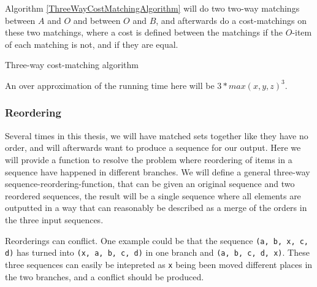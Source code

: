 \documentclass[11pt]{article}
\begin{document}
Algorithm \ref{ThreeWayCostMatchingAlgorithm} will do two two-way matchings between $A$ and $O$ and between $O$ and $B$, and afterwards do a cost-matchings on these two matchings, where a cost is defined between the matchings if the $O$-item of each matching is not, and if they are equal.


\begin{algorithm}
\caption{Three-way cost-matching algorithm}
  \label{ThreeWayCostMatchingAlgorithm}
\end{algorithm}

An over approximation of the running time here will be  $3*max(x, y, z)^3$.


\subsubsection{Reordering}
\label{ThreeWayReorderingAlgorithmSec}
Several times in this thesis, we will have matched sets together like they have no order, and will afterwards want to produce a sequence for our output. Here we will provide a function to resolve the problem where reordering of items in a sequence have happened in different branches. We will define a general three-way sequence-reordering-function, that can be given an original sequence and two reordered sequences, the result will be a single sequence where all elements are outputted in a way that can reasonably be described as a merge of the orders in the three input sequences.

Reorderings can conflict. One example could be that the sequence \texttt{(a, b, x, c, d)} has turned into \texttt{(x, a, b, c, d)} in one branch and \texttt{(a, b, c, d, x)}. These three sequences can easily be intepreted as \texttt{x} being been moved different places in the two branches, and a conflict should be produced.
\end{document}
